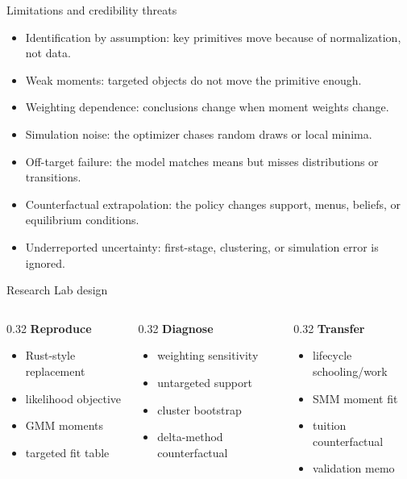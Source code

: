 \documentclass[aspectratio=169,11pt]{beamer}
\newcommand{\1}{\mathbf{1}}
\begin{document}
\begin{frame}{Limitations and credibility threats}
\begin{itemize}
    \item Identification by assumption: key primitives move because of normalization, not data.
    \item Weak moments: targeted objects do not move the primitive enough.
    \item Weighting dependence: conclusions change when moment weights change.
    \item Simulation noise: the optimizer chases random draws or local minima.
    \item Off-target failure: the model matches means but misses distributions or transitions.
    \item Counterfactual extrapolation: the policy changes support, menus, beliefs, or equilibrium conditions.
    \item Underreported uncertainty: first-stage, clustering, or simulation error is ignored.
\end{itemize}
\end{frame}

\begin{frame}{Research Lab design}
\begin{columns}[T,onlytextwidth]
\begin{column}{0.32\linewidth}
\textbf{Reproduce}
\begin{itemize}
    \item Rust-style replacement
    \item likelihood objective
    \item GMM moments
    \item targeted fit table
\end{itemize}
\end{column}
\begin{column}{0.32\linewidth}
\textbf{Diagnose}
\begin{itemize}
    \item weighting sensitivity
    \item untargeted support
    \item cluster bootstrap
    \item delta-method counterfactual
\end{itemize}
\end{column}
\begin{column}{0.32\linewidth}
\textbf{Transfer}
\begin{itemize}
    \item lifecycle schooling/work
    \item SMM moment fit
    \item tuition counterfactual
    \item validation memo
\end{itemize}
\end{column}
\end{columns}
\end{frame}
\end{document}
